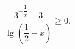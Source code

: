 \begin{ex}[type=inequality]
	\begin{condition}
		$ \dfrac{3^{ - \dfrac{1}{x}} - 3}{\lg\left(\dfrac{1}{2} - x\right)}\geqslant 0.$
	\end{condition}
	\answer{$ x \in[-1;0,5)\cup(0;0,5).$}
\end{ex}